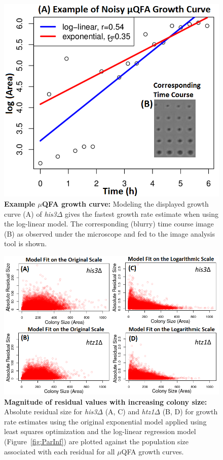 \documentclass{bioinfo}
\begin{document}
{\begin{figure}[H]
\vspace{-1.5em}
\centering
\includegraphics[width=0.75\linewidth]{HIS3ModelComp.png}
\vspace{-1em}
\caption{\footnotesize{\textbf{Example $\mu$QFA growth curve:} Modeling the displayed growth curve (A) of \textit{his3}$\Delta$ gives the fastest growth rate estimate when using the log-linear model. The corresponding (blurry) time course image (B) as observed under the microscope and fed to the image analysis tool is shown.}}
\label{fig:ExGC}
\vspace{-2em}
\end{figure} 

\vspace{-2.5em}
\begin{figure}[H]
\centering
\includegraphics[width=1\linewidth]{ResColSizeLawless.png}
\vspace{-2em}
\caption{\footnotesize{\textbf{Magnitude of residual values with increasing colony size:} Absolute residual size for \textit{his3}$\Delta$ (A, C) and \textit{htz1}$\Delta$ (B, D) for growth rate estimates using the original exponential model applied using least squares optimization and the log-linear regression model (Figure~\ref{fig:ParInf}) are plotted against the population size associated with each residual for all $\mu$QFA growth curves.}}
\label{fig:ResSize}
\vspace{-1em}
\end{figure}

}
\end{document}
